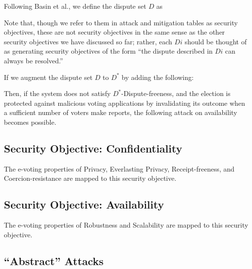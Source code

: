 \documentclass[10pt,letterpaper]{article}
\begin{document}
Following Basin et al.\cite{BasinEtAlDisputeResolution2020}, we define the dispute set $D$ as
%


Note that, though we refer to them in attack and mitigation tables as security objectives, these are not security objectives in the same sense as the other security objectives we have discussed so far; rather, each $Di$ should be thought of as generating security objectives of the form ``the dispute described in $Di$ can always be resolved.''



If we augment the dispute set $D$ to $D^*$ by adding the following:
%


Then, if the system does not satisfy $D^*$-Dispute-freeness, and the election is protected against malicious voting applications by invalidating its outcome when a sufficient number of voters make reports, the following attack on availability becomes possible.



\subsection{Security Objective: Confidentiality}

The e-voting properties of Privacy, Everlasting Privacy, Receipt-freeness, and Coercion-resistance are mapped to this security objective.





\subsection{Security Objective: Availability}

The e-voting properties of Robustness and Scalability are mapped to this security objective.





\subsection{``Abstract'' Attacks}
\label{sec:abstract-attacks}
\end{document}
